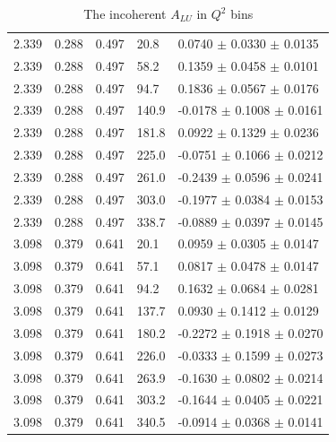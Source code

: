 \begin{table}[!h]
\begin{center}
\begin{tabular}{||l|l|l|l|l||}
  2.339 & 0.288 & 0.497  &  20.8  &  0.0740  $\pm$  0.0330  $\pm$ 0.0135 \\
  2.339 & 0.288 & 0.497  &  58.2  &  0.1359  $\pm$  0.0458  $\pm$ 0.0101 \\
  2.339 & 0.288 & 0.497  &  94.7  &  0.1836  $\pm$  0.0567  $\pm$ 0.0176 \\
  2.339 & 0.288 & 0.497  & 140.9  & -0.0178  $\pm$  0.1008  $\pm$ 0.0161 \\
  2.339 & 0.288 & 0.497  & 181.8  &  0.0922  $\pm$  0.1329  $\pm$ 0.0236 \\
  2.339 & 0.288 & 0.497  & 225.0  & -0.0751  $\pm$  0.1066  $\pm$ 0.0212 \\
  2.339 & 0.288 & 0.497  & 261.0  & -0.2439  $\pm$  0.0596  $\pm$ 0.0241 \\
  2.339 & 0.288 & 0.497  & 303.0  & -0.1977  $\pm$  0.0384  $\pm$ 0.0153 \\
  2.339 & 0.288 & 0.497  & 338.7  & -0.0889  $\pm$  0.0397  $\pm$ 0.0145 \\
                                                                           
  \hline                                                              
  3.098 & 0.379 & 0.641  & 20.1   & 0.0959   $\pm$  0.0305  $\pm$ 0.0147 \\ 
  3.098 & 0.379 & 0.641  & 57.1   & 0.0817   $\pm$  0.0478  $\pm$ 0.0147 \\
  3.098 & 0.379 & 0.641  & 94.2   & 0.1632   $\pm$  0.0684  $\pm$ 0.0281 \\
  3.098 & 0.379 & 0.641  &137.7   & 0.0930   $\pm$  0.1412  $\pm$ 0.0129 \\
  3.098 & 0.379 & 0.641  &180.2   &-0.2272   $\pm$  0.1918  $\pm$ 0.0270 \\
  3.098 & 0.379 & 0.641  &226.0   &-0.0333   $\pm$  0.1599  $\pm$ 0.0273 \\
  3.098 & 0.379 & 0.641  &263.9   &-0.1630   $\pm$  0.0802  $\pm$ 0.0214 \\
  3.098 & 0.379 & 0.641  &303.2   &-0.1644   $\pm$  0.0405  $\pm$ 0.0221 \\
  3.098 & 0.379 & 0.641  &340.5   &-0.0914   $\pm$  0.0368  $\pm$ 0.0141 \\
 \hline
 \hline
      \end{tabular}
      \caption{The incoherent $A_{LU}$ in $Q^2$ bins}
      \label{table:InCoh_Q2_BSA}
   \end{center}
\end{table}


